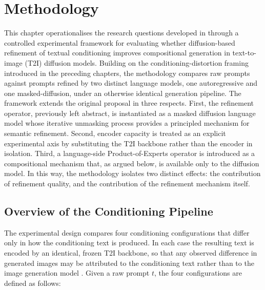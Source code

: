 \documentclass[a4paper,twoside,12pt]{report}
\begin{document}
\chapter{Methodology}
\label{ch:method}

This chapter operationalises the research questions developed in
 through a controlled experimental framework for evaluating
whether diffusion-based refinement of textual conditioning improves
compositional generation in text-to-image (T2I) diffusion models. Building on
the conditioning-distortion framing introduced in the preceding chapters, the
methodology compares raw prompts against prompts refined by two distinct
language models, one autoregressive and one masked-diffusion, under an
otherwise identical generation pipeline. The framework extends the original
proposal in three respects. First, the refinement operator, previously left
abstract, is instantiated as a masked diffusion language model whose iterative
unmasking process provides a principled mechanism for semantic refinement.
Second, encoder capacity is treated as an explicit experimental axis by
substituting the T2I backbone rather than the encoder in isolation. Third, a
language-side Product-of-Experts operator is introduced as a compositional
mechanism that, as argued below, is available only to the diffusion model. In
this way, the methodology isolates two distinct effects: the contribution of
refinement quality, and the contribution of the refinement mechanism itself.

\section{Overview of the Conditioning Pipeline}
\label{sec:pipeline}

The experimental design compares four conditioning configurations that differ
only in how the conditioning text is produced. In each case the resulting text
is encoded by an identical, frozen T2I backbone, so that any observed
difference in generated images may be attributed to the conditioning text
rather than to the image generation model \citep{rombach2022ldm}. Given a raw
prompt \(t\), the four configurations are defined as follows:
\end{document}
